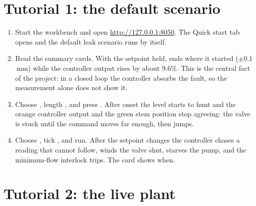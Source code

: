 \section{Tutorial 1: the default scenario}

\begin{enumerate}
  \item Start the workbench and open \url{http://127.0.0.1:8050}. The Quick
        start tab opens and the default leak scenario runs by itself.
  \item Read the summary cards. With the setpoint held,  ends where
        it started ($\pm0.1$\,mm) while the controller output rises by about
        9.6\%. This is the central fact of the project: in a closed loop the
        controller absorbs the fault, so the measurement alone does not show
        it.
  \item Choose , length , and press
        . After onset the level starts to hunt and the
        orange controller output and the green stem position stop agreeing:
        the valve is stuck until the command moves far enough, then jumps.
  \item Choose , tick , and run. After
        the setpoint changes the controller chases a reading that cannot
        follow, winds the valve shut, starves the pump, and the minimum-flow
        interlock trips. The  card shows when.
\end{enumerate}

\section{Tutorial 2: the live plant}

